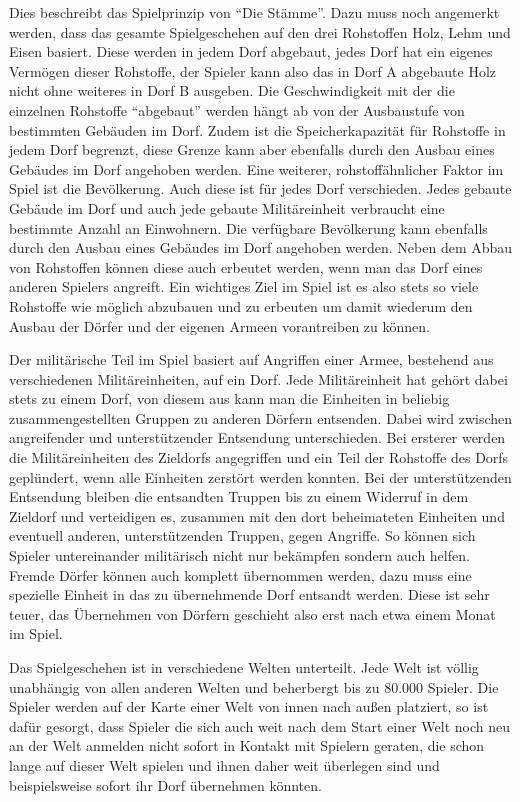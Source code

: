 \documentclass[10pt]{scrartcl}
\begin{document}
  Dies beschreibt das Spielprinzip von ``Die Stämme''. Dazu muss noch angemerkt werden, dass das gesamte Spielgeschehen auf den drei Rohstoffen Holz, Lehm und Eisen basiert. Diese werden in jedem Dorf abgebaut, jedes Dorf hat ein eigenes Vermögen dieser Rohstoffe, der Spieler kann also das in Dorf A abgebaute Holz nicht ohne weiteres in Dorf B ausgeben. Die Geschwindigkeit mit der die einzelnen Rohstoffe ``abgebaut'' werden hängt ab von der Ausbaustufe von bestimmten Gebäuden im Dorf. Zudem ist die Speicherkapazität für Rohstoffe in jedem Dorf begrenzt, diese Grenze kann aber ebenfalls durch den Ausbau eines Gebäudes im Dorf angehoben werden. Eine weiterer, rohstoffähnlicher Faktor im Spiel ist die Bevölkerung. Auch diese ist für jedes Dorf verschieden. Jedes gebaute Gebäude im Dorf und auch jede gebaute Militäreinheit verbraucht eine bestimmte Anzahl an Einwohnern. Die verfügbare Bevölkerung kann ebenfalls durch den Ausbau eines Gebäudes im Dorf angehoben werden. Neben dem Abbau von Rohstoffen können diese auch erbeutet werden, wenn man das Dorf eines anderen Spielers angreift. Ein wichtiges Ziel im Spiel ist es also stets so viele Rohstoffe wie möglich abzubauen und zu erbeuten um damit wiederum den Ausbau der Dörfer und der eigenen Armeen vorantreiben zu können.
  
  Der militärische Teil im Spiel basiert auf Angriffen einer Armee, bestehend aus verschiedenen Militäreinheiten, auf ein Dorf. Jede Militäreinheit hat gehört dabei stets zu einem Dorf, von diesem aus kann man die Einheiten in beliebig zusammengestellten Gruppen zu anderen Dörfern entsenden. Dabei wird zwischen angreifender und unterstützender Entsendung unterschieden. Bei ersterer werden die Militäreinheiten des Zieldorfs angegriffen und ein Teil der Rohstoffe des Dorfs geplündert, wenn alle Einheiten zerstört werden konnten. Bei der unterstützenden Entsendung bleiben die entsandten Truppen bis zu einem Widerruf in dem Zieldorf und verteidigen es, zusammen mit den dort beheimateten Einheiten und eventuell anderen, unterstützenden Truppen, gegen Angriffe. So können sich Spieler untereinander militärisch nicht nur bekämpfen sondern auch helfen. Fremde Dörfer können auch komplett übernommen werden, dazu muss eine spezielle Einheit in das zu übernehmende Dorf entsandt werden. Diese ist sehr teuer, das Übernehmen von Dörfern geschieht also erst nach etwa einem Monat im Spiel.
  
  Das Spielgeschehen ist in verschiedene Welten unterteilt. Jede Welt ist völlig unabhängig von allen anderen Welten und beherbergt bis zu $80.000$ Spieler. Die Spieler werden auf der Karte einer Welt von innen nach außen platziert, so ist dafür gesorgt, dass Spieler die sich auch weit nach dem Start einer Welt noch neu an der Welt anmelden nicht sofort in Kontakt mit Spielern geraten, die schon lange auf dieser Welt spielen und ihnen daher weit überlegen sind und beispielsweise sofort ihr Dorf übernehmen könnten.
  
\end{document}
